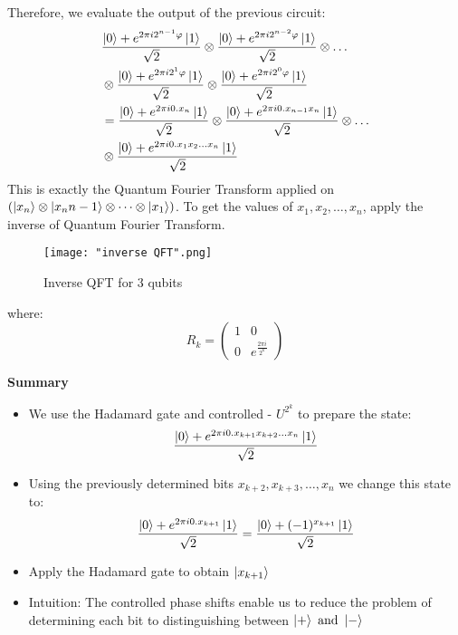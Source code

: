 \documentclass[12pt]{article}
\begin{document}
Therefore, we evaluate the output of the previous circuit:
\begin{equation}
\begin{split}
&\frac{\ket{0} + e^{2 \pi i 2^{n-1} \varphi} \ket{1}}{\sqrt{2}} \otimes \frac{\ket{0} + e^{2 \pi i 2^{n-2} \varphi} \ket{1}}{\sqrt{2}} \otimes \dots \\
&\otimes \frac{\ket{0} + e^{2 \pi i 2^{1} \varphi} \ket{1}}{\sqrt{2}}\otimes \frac{\ket{0} + e^{2 \pi i 2^{0} \varphi} \ket{1}}{\sqrt{2}} \\
&= \frac{\ket{0} + e^{2 \pi i 0.x_{n}} \ket{1}}{\sqrt{2}} \otimes \frac{\ket{0} + e^{2 \pi i 0.x_{n-1}x_{n}} \ket{1}}{\sqrt{2}} \otimes \dots \\
&\otimes \frac{\ket{0} + e^{2 \pi i 0.x_{1}x_{2} \dots x_{n}} \ket{1}}{\sqrt{2}}
\end{split}
\end{equation}
This is exactly the Quantum Fourier Transform applied on $(\ket{x_n} \otimes \ket{x_n{n-1}} \otimes \dots \otimes \ket{x_{1}})$. To get the values of $x_{1}, x_{2}, \dots, x_{n}$, apply the inverse of Quantum Fourier Transform. 

\begin{figure}[h]
    \centering
    \texttt{[image: "inverse QFT".png]}
    \caption{Inverse QFT for 3 qubits}
    \label{fig: Inverse QFT for 3 qubits}
\end{figure}

where:
\[
R_{k} = 
\begin{pmatrix}
1 & 0 \\
0 & e^{\frac{2 \pi i}{2^k}}
\end{pmatrix}
\]

\textbf{Summary}
\begin{itemize}
\item We use the Hadamard gate and controlled - $U^{2^{k}}$ to prepare the state:
$$
\frac{\ket{0} + e^{2 \pi i 0.x_{k+1}x_{k+2} \dots x_{n}} \ket{1}}{\sqrt{2}}
$$
\item Using the previously determined bits $x_{k+2}, x_{k+3}, \dots, x_{n}$ we change this state to:
$$
\frac{\ket{0} + e^{2 \pi i 0.x_{k+1}} \ket{1}}{\sqrt{2}} = \frac{\ket{0} + (-1)^{x_{k+1}} \ket{1}}{\sqrt{2}}
$$
\item Apply the Hadamard gate to obtain $\ket{x_{k+1}}$
\item Intuition: The controlled phase shifts enable us to reduce the problem of determining each bit to distinguishing between $\ket{+} \text{ and } \ket{-}$
\end{itemize}
\end{document}
